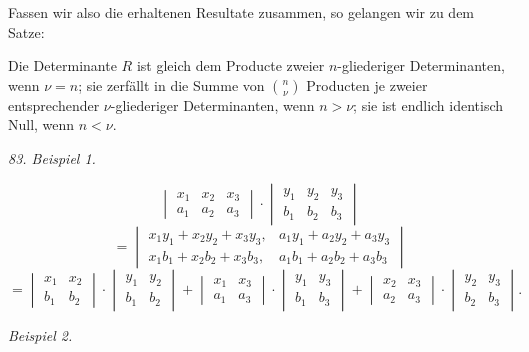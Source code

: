 \documentclass[11pt]{article}
\begin{document}
Fassen wir also die erhaltenen Resultate zusammen, so gelangen wir zu dem Satze:

\glqq Die Determinante $R$ ist gleich dem Producte zweier $n$-gliederiger Determinanten, wenn $\nu=n$; sie zerfällt in die Summe von $\binom{n}{\nu}$ Producten je zweier entsprechender $\nu$-gliederiger Determinanten, wenn $n>\nu$; sie ist endlich identisch Null, wenn $n<\nu$.\grqq{}

\textit{83. Beispiel 1.}

\[
\begin{vmatrix}
x_1 & x_2 & x_3\\
a_1 & a_2 & a_3
\end{vmatrix}
\cdot
\begin{vmatrix}
y_1 & y_2 & y_3\\
b_1 & b_2 & b_3
\end{vmatrix}
\]
\[
=
\begin{vmatrix}
x_1y_1+x_2y_2+x_3y_3, & a_1y_1+a_2y_2+a_3y_3\\
x_1b_1+x_2b_2+x_3b_3, & a_1b_1+a_2b_2+a_3b_3
\end{vmatrix}
\]
\[
=
\begin{vmatrix}x_1 & x_2\\ b_1 & b_2\end{vmatrix}\cdot\begin{vmatrix}y_1 & y_2\\ b_1 & b_2\end{vmatrix}
+\begin{vmatrix}x_1 & x_3\\ a_1 & a_3\end{vmatrix}\cdot\begin{vmatrix}y_1 & y_3\\ b_1 & b_3\end{vmatrix}
+\begin{vmatrix}x_2 & x_3\\ a_2 & a_3\end{vmatrix}\cdot\begin{vmatrix}y_2 & y_3\\ b_2 & b_3\end{vmatrix}.
\]

\textit{Beispiel 2.}
\end{document}

